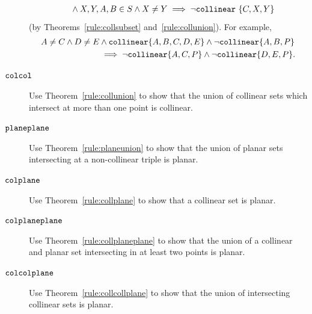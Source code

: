 \begin{description}
\begin{align*}
  &\qquad\wedge X,Y,A,B \in S \wedge X \neq Y\implies \neg\texttt{collinear}\ \{C,X,Y\}
\end{align*} (by Theorems~\ref{rule:collsubset} and~\ref{rule:collunion}). For example,
\begin{align*}
A \neq C \wedge D \neq E &\wedge \texttt{collinear} \{A, B, C, D, E\} \wedge \neg\texttt{collinear} \{A, B, P\}\\
&\implies \neg\texttt{collinear} \{A, C, P\} \wedge \neg\texttt{collinear} \{D, E, P\}.
\end{align*}
\item[$\texttt{colcol}$] Use Theorem~\ref{rule:collunion} to show that the union of collinear sets which intersect at more than one point is collinear.
\item[$\texttt{planeplane}$] Use Theorem~\ref{rule:planeunion} to show that the union of planar sets intersecting at a non-collinear triple is planar.
\item[$\texttt{colplane}$] Use Theorem~\ref{rule:collplane} to show that a collinear set is planar.
\item[$\texttt{colplaneplane}$] Use Theorem~\ref{rule:collplaneplane} to show that the union of a collinear and planar set intersecting in at least two points is planar.
\item[$\texttt{colcolplane}$] Use Theorem~\ref{rule:collcollplane} to show that the union of intersecting collinear sets is planar.
\end{description}



